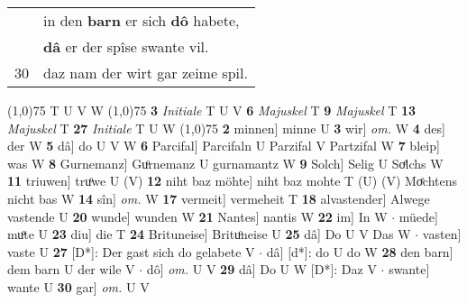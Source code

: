 \documentclass[8pt,a4paper,notitlepage]{article}
\begin{document}
\begin{table}[ht]
\begin{minipage}[t]{0.5\linewidth}
\begin{tabular}{rl}
 & in den \textbf{barn} er sich \textbf{dô} habete,\\ 
 & \textbf{dâ} er der spîse swante vil.\\ 
30 & daz nam der wirt gar zeime spil.\\ 
\end{tabular}
\scriptsize
\line(1,0){75} \newline
T U V W \newline
\line(1,0){75} \newline
\textbf{3} \textit{Initiale} T U V  \textbf{6} \textit{Majuskel} T  \textbf{9} \textit{Majuskel} T  \textbf{13} \textit{Majuskel} T  \textbf{27} \textit{Initiale} T U W  \newline
\line(1,0){75} \newline
\textbf{2} minnen] minne U \textbf{3} wir] \textit{om.} W \textbf{4} des] der W \textbf{5} dâ] do U V W \textbf{6} Parcifal] Parcifaln U Parzifal V Partzifal W \textbf{7} bleip] was W \textbf{8} Gurnemanz] Guͦrnemanz U gurnamantz W \textbf{9} Solch] Selig U Soͤlchs W \textbf{11} triuwen] truͦwe U (V) \textbf{12} niht baz möhte] niht baz mohte T (U) (V) Moͤchtens nicht bas W \textbf{14} sîn] \textit{om.} W \textbf{17} vermeit] vermeheit T \textbf{18} alvastender] Alwege vastende U \textbf{20} wunde] wunden W \textbf{21} Nantes] nantis W \textbf{22} im] In W  $\cdot$ müede] muͦte U \textbf{23} diu] die T \textbf{24} Brituneise] Brituͦneise U \textbf{25} dâ] Do U V Das W  $\cdot$ vasten] vaste U \textbf{27} [D*]: Der gast sich do gelabete V  $\cdot$ dâ] [d*]: do U do W \textbf{28} den barn] dem barn U der wile V  $\cdot$ dô] \textit{om.} U V \textbf{29} dâ] Do U W [D*]: Daz V  $\cdot$ swante] wante U \textbf{30} gar] \textit{om.} U V \newline
\end{minipage}
\end{table}
\end{document}
